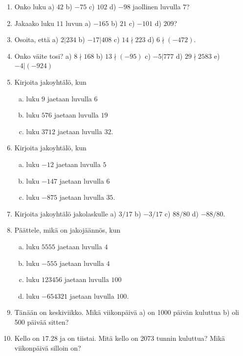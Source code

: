 \begin{enumerate}

\item Onko luku a) $42$ b) $-75$ c) $102$ d) $-98$ jaollinen luvulla $7$?

\item Jakaako luku $11$ luvun a) $-165$ b) $21$ c) $-101$ d) $209$?

\item Osoita, että a) $2|234$ b) $-17|408$ c) $14 \nmid 223$ d) $6 \nmid (-472)$.

\item Onko väite tosi? a) $8 \nmid 168$ b) $13 \nmid (-95)$ c) $-5|777$ d) $29\nmid 2583$ e) $-4|(-924)$

\item Kirjoita jakoyhtälö, kun
\begin{enumerate}[a)]
\item luku $9$ jaetaan luvulla $6$
\item luku $576$ jaetaan luvulla $19$
\item luku $3712$ jaetaan luvulla $32$.
\end{enumerate}

\item Kirjoita jakoyhtälö, kun
\begin{enumerate}[a)]
\item luku $-12$ jaetaan luvulla $5$
\item luku $-147$ jaetaan luvulla $6$
\item luku $-875$ jaetaan luvulla $35$.
\end{enumerate}

\item Kirjoita jakoyhtälö jakolaskulle a) $3/17$ b) $-3/17$ c) $88/80$ d) $-88/80$.

\item Päättele, mikä on jakojäännös, kun
\begin{enumerate}[a)]
\item luku $5555$ jaetaan luvulla $4$
\item luku $-555$ jaetaan luvulla $4$
\item luku $123456$ jaetaan luvulla $100$
\item luku $-654321$ jaetaan luvulla $100$.
\end{enumerate}

\item Tänään on keskiviikko. Mikä viikonpäivä a) on 1000 päivän kuluttua b) oli 500 päivää sitten?

\item Kello on $17.28$ ja on tiistai. Mitä kello on 2073 tunnin kuluttua? Mikä viikonpäivä silloin on?


\end{enumerate}
